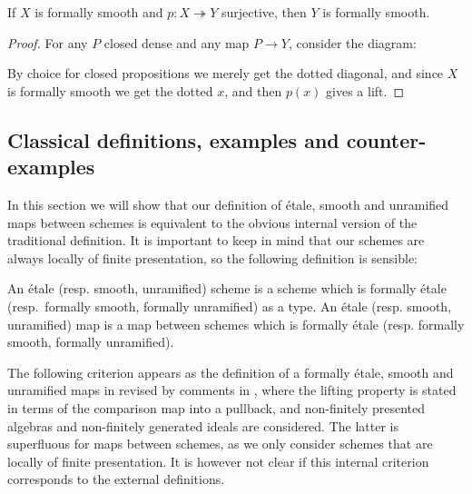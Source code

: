 \begin{proposition}\label{smoothSurjective}
If $X$ is formally smooth and $p:X\twoheadrightarrow Y$ surjective, then $Y$ is formally smooth.
\end{proposition}

\begin{proof}
For any $P$ closed dense and any map $P\to Y$, consider the diagram:
 \begin{center}
    \end{center} 
    By choice for closed propositions we merely get the dotted diagonal, and since $X$ is formally smooth we get the dotted $x$, and then $p(x)$ gives a lift.
\end{proof}


\subsection{Classical definitions, examples and counter-examples}

In this section we will show that our definition of étale, smooth and unramified maps between schemes is equivalent to the obvious internal version of the traditional definition. It is important to keep in mind that our schemes are always locally of finite presentation, so the following definition is sensible:

\begin{definition}
  An étale (resp. smooth, unramified) scheme is a scheme which is formally étale (resp.\ formally smooth, formally unramified) as a type.
  An étale (resp. smooth, unramified) map is a map between schemes which is formally étale (resp. formally smooth, formally unramified).
\end{definition}

The following criterion appears as the definition of a formally étale, smooth and unramified maps in \cite[§17]{EGAIV4} revised by comments in \cite{insert stacks project reference here},
where the lifting property is stated in terms of the comparison map into a pullback, and non-finitely presented algebras and non-finitely generated ideals are considered. The latter is superfluous for maps between schemes, as we only consider schemes that are locally of finite presentation. It is however not clear if this internal criterion corresponds to the external definitions.

